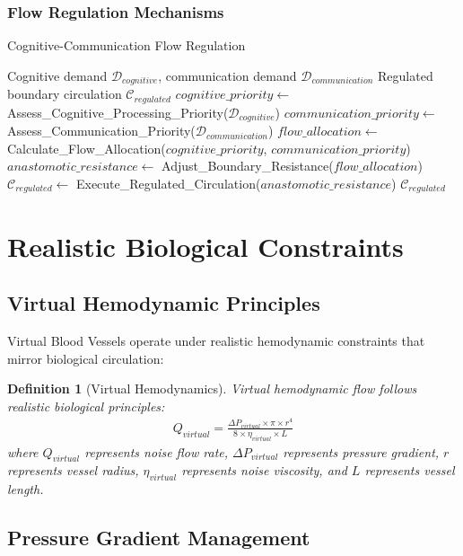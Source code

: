 \documentclass[12pt,a4paper]{article}
\newtheorem{definition}{Definition}
\begin{document}
\subsubsection{Flow Regulation Mechanisms}

\begin{algorithm}
\caption{Cognitive-Communication Flow Regulation}
\begin{algorithmic}[1]
\require Cognitive demand $\mathcal{D}_{cognitive}$, communication demand $\mathcal{D}_{communication}$
\ensure Regulated boundary circulation $\mathcal{C}_{regulated}$
\STATE $cognitive\_priority \leftarrow$ Assess\_Cognitive\_Processing\_Priority($\mathcal{D}_{cognitive}$)
\STATE $communication\_priority \leftarrow$ Assess\_Communication\_Priority($\mathcal{D}_{communication}$)
\STATE $flow\_allocation \leftarrow$ Calculate\_Flow\_Allocation($cognitive\_priority$, $communication\_priority$)
\STATE $anastomotic\_resistance \leftarrow$ Adjust\_Boundary\_Resistance($flow\_allocation$)
\STATE $\mathcal{C}_{regulated} \leftarrow$ Execute\_Regulated\_Circulation($anastomotic\_resistance$)
\RETURN $\mathcal{C}_{regulated}$
\end{algorithmic}
\end{algorithm}

\section{Realistic Biological Constraints}

\subsection{Virtual Hemodynamic Principles}

Virtual Blood Vessels operate under realistic hemodynamic constraints that mirror biological circulation:

\begin{definition}[Virtual Hemodynamics]
Virtual hemodynamic flow follows realistic biological principles:
\begin{align}
Q_{virtual} = \frac{\Delta P_{virtual} \times \pi \times r^4}{8 \times \eta_{virtual} \times L}
\end{align}
where $Q_{virtual}$ represents noise flow rate, $\Delta P_{virtual}$ represents pressure gradient, $r$ represents vessel radius, $\eta_{virtual}$ represents noise viscosity, and $L$ represents vessel length.
\end{definition}

\subsection{Pressure Gradient Management}
\end{document}
